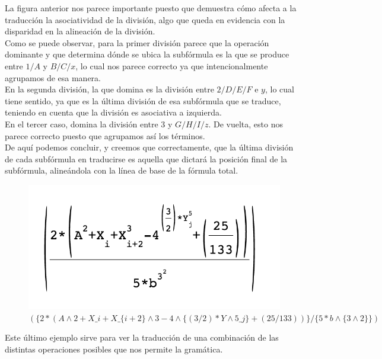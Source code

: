 \indent La figura anterior nos parece importante puesto que demuestra cómo afecta a la traducción la asociatividad de la división, algo que queda en evidencia con la disparidad en la alineación de la división.\\
\indent Como se puede observar, para la primer división parece que la operación dominante y que determina dónde se ubica la subfórmula es la que se produce entre $1/A$ y $B/C/x$, lo cual nos parece correcto ya que intencionalmente agrupamos de esa manera.\\ 
\indent En la segunda división, la que domina es la división entre $2/D/E/F$ e $y$, lo cual tiene sentido, ya que es la última división de esa subfórmula que se traduce, teniendo en cuenta que la división es asociativa a izquierda.\\
\indent En el tercer caso, domina la división entre 3 y $G/H/I/z$. De vuelta, esto nos parece correcto puesto que agrupamos así los términos.\\
\indent De aquí podemos concluir, y creemos que correctamente, que la última división de cada subfórmula en traducirse es aquella que dictará la posición final de la subfórmula, alineándola con la línea de base de la fórmula total.\\

\begin{figure}[H]
      \begin{centering}
        \includegraphics{imgs/i}
        \caption{$(\{2*(A\wedge2+X\_i+X\_\{i+2\}\wedge3-4\wedge\{(3/2)*Y\wedge5\_j\}+(25/133))\}/\{5*b\wedge\{3\wedge2\}\})$}
       \end{centering}
\end{figure}

\indent Este último ejemplo sirve para ver la traducción de una combinación de las distintas operaciones posibles que nos permite la gramática.\\

